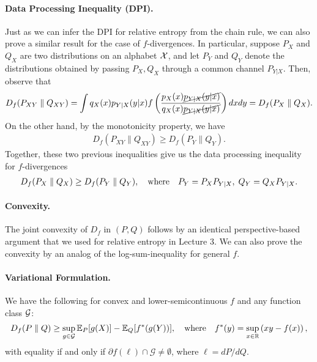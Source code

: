 \documentclass[12pt]{article}
\begin{document}
\paragraph{Data Processing Inequality (DPI).} Just as we can infer the DPI for relative entropy from the chain rule, we can also prove a similar result for the case of $f$-divergences. In particular, suppose $P_X$ and $Q_X$ are two distributions on an alphabet ${\cal X}$, and let $P_Y$ and $Q_Y$ denote the distributions obtained by passing $P_X, Q_X$ through a common channel $P_{Y|X}$. Then, observe that 
\begin{align}
	D_f(P_{XY} \parallel Q_{XY}) = \int q_X(x) p_{Y|X}(y|x) f \left( \frac{p_X(x) \cancel{p_{Y|X}(y|x)}}{q_X(x) \cancel{p_{Y|X}(y|x)}} \right) dx dy = D_f(P_X \parallel Q_X). 
\end{align}
On the other hand, by the monotonicity property, we have 
\begin{align}
D_f(P_{XY} \parallel Q_{XY}) \geq D_f(P_Y \parallel Q_Y). 
\end{align}
Together, these two previous inequalities give us the data processing inequality for $f$-divergences 
\begin{align}
D_f(P_{X} \parallel Q_X) \geq D_f(P_Y \parallel Q_Y), \quad \text{where} \quad P_Y = P_X P_{Y|X}, \; Q_Y = Q_X P_{Y|X}. 
\end{align}

\paragraph{Convexity.} The joint convexity of $D_f$ in $(P,Q)$ follows by an identical perspective-based argument that we used for relative entropy in Lecture 3.  We can also prove the convexity by an analog of the log-sum-inequality for general $f$. 

\paragraph{Variational Formulation.} We have the following for convex and lower-semicontinuous $f$ and any function class ${\cal G}$: 
\begin{align}
D_f(P\parallel Q) \geq \sup_{g \in {\cal G}} \mathbb{E}_P[g(X)] - \mathbb{E}_Q[f^*(g(Y))], \quad \text{where} \quad f^*(y) = \sup_{x \in \mathbb{R}} \left( x y - f(x) \right), 
\end{align}
with equality if and only if $ \partial f(\ell) \cap  \mathcal{G} \not= \emptyset$, where $\ell = dP/dQ$. 
\end{document}
